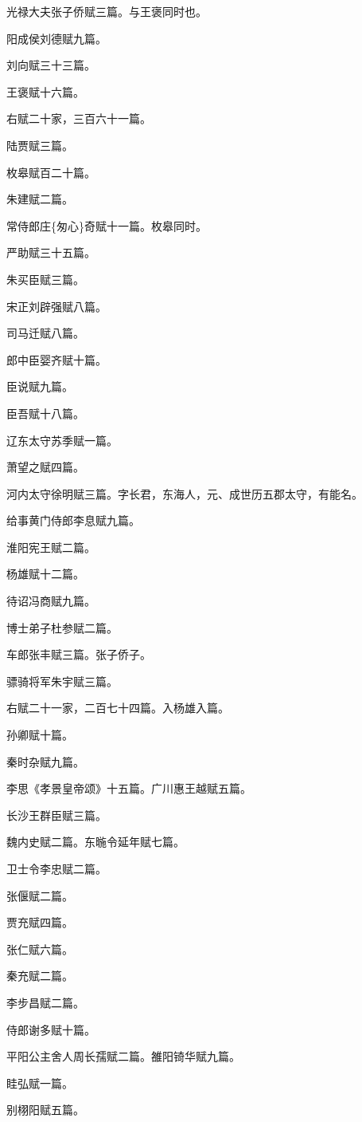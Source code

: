 \documentclass[]{article}
\begin{document}
光禄大夫张子侨赋三篇。与王褒同时也。

阳成侯刘德赋九篇。

刘向赋三十三篇。

王褒赋十六篇。

右赋二十家，三百六十一篇。

陆贾赋三篇。

枚皋赋百二十篇。

朱建赋二篇。

常侍郎庄\{匆心\}奇赋十一篇。枚皋同时。

严助赋三十五篇。

朱买臣赋三篇。

宋正刘辟强赋八篇。

司马迁赋八篇。

郎中臣婴齐赋十篇。

臣说赋九篇。

臣吾赋十八篇。

辽东太守苏季赋一篇。

萧望之赋四篇。

河内太守徐明赋三篇。字长君，东海人，元、成世历五郡太守，有能名。

给事黄门侍郎李息赋九篇。

淮阳宪王赋二篇。

杨雄赋十二篇。

待诏冯商赋九篇。

博士弟子杜参赋二篇。

车郎张丰赋三篇。张子侨子。

骠骑将军朱宇赋三篇。

右赋二十一家，二百七十四篇。入杨雄入篇。

孙卿赋十篇。

秦时杂赋九篇。

李思《孝景皇帝颂》十五篇。广川惠王越赋五篇。

长沙王群臣赋三篇。

魏内史赋二篇。东暆令延年赋七篇。

卫士令李忠赋二篇。

张偃赋二篇。

贾充赋四篇。

张仁赋六篇。

秦充赋二篇。

李步昌赋二篇。

侍郎谢多赋十篇。

平阳公主舍人周长孺赋二篇。雒阳锜华赋九篇。

眭弘赋一篇。

别栩阳赋五篇。
\end{document}
